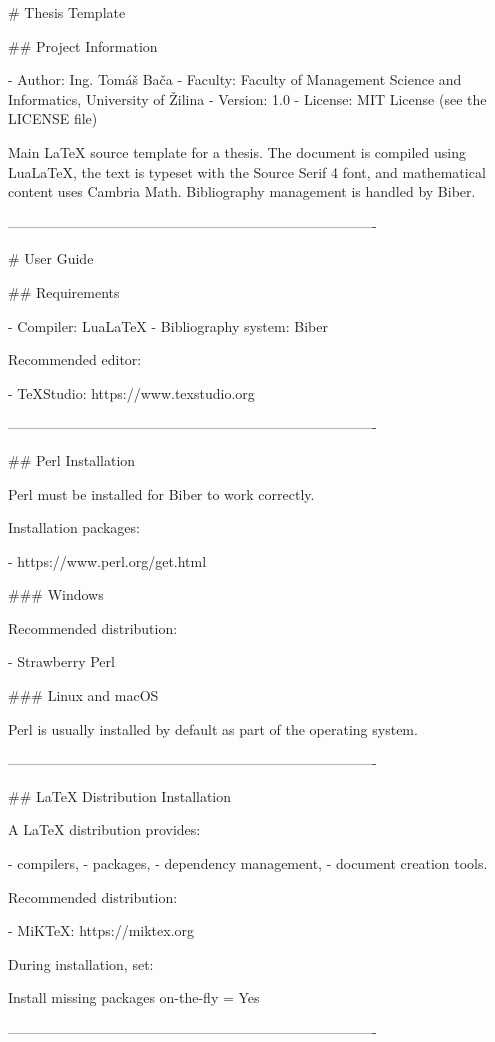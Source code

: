 \iffalse
# Thesis Template

## Project Information

- Author: Ing. Tomáš Bača
- Faculty: Faculty of Management Science and Informatics, University of Žilina
- Version: 1.0
- License: MIT License (see the LICENSE file)

Main LaTeX source template for a thesis. The document is compiled using LuaLaTeX, the text is typeset with the Source Serif 4 font, and mathematical content uses Cambria Math. Bibliography management is handled by Biber.

-------------------------------------------------------------------------------

# User Guide

## Requirements

- Compiler: LuaLaTeX
- Bibliography system: Biber

Recommended editor:

- TeXStudio: https://www.texstudio.org

-------------------------------------------------------------------------------

## Perl Installation

Perl must be installed for Biber to work correctly.

Installation packages:

- https://www.perl.org/get.html

### Windows

Recommended distribution:

- Strawberry Perl

### Linux and macOS

Perl is usually installed by default as part of the operating system.

-------------------------------------------------------------------------------

## LaTeX Distribution Installation

A LaTeX distribution provides:

- compilers,
- packages,
- dependency management,
- document creation tools.

Recommended distribution:

- MiKTeX: https://miktex.org

During installation, set:

Install missing packages on-the-fly = Yes

-------------------------------------------------------------------------------

